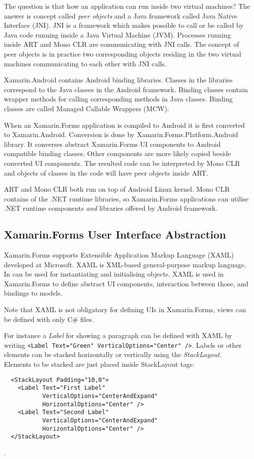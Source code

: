 \documentclass[conference]{IEEEtran}
\newcommand{\code}[1]{{\small\texttt{#1}}}
\begin{document}
The question is that how an application can run inside two virtual machines? The answer is concept called \emph{peer objects} and a Java framework called Java Native Interface (JNI). JNI is a framework which makes possible to call or be called by Java code running inside a Java Virtual Machine (JVM). Processes running inside ART and Mono CLR are communicating with JNI calls. The concept of peer objects is in practice two corresponding objects residing in the two virtual machines communicating to each other with JNI calls.

Xamarin.Android contains Android binding libraries. Classes in the libraries correspond to the Java classes in the Android framework. Binding classes contain wrapper methods for calling corresponding methods in Java classes. Binding classes are called Managed Callable Wrappers (MCW).

When an Xamarin.Forms application is compiled to Android it is first converted to Xamarin.Android. Conversion is done by Xamarin.Forms.Platform.Android library. It converses abstract Xamarin.Forms UI components to Android compatible binding classes. Other components are more likely copied beside converted UI components. The resulted code can be interpreted by Mono CLR and objects of classes in the code will have peer objects inside ART.

ART and Mono CLR both run on top of Android Linux kernel. Mono CLR contains of the .NET runtime libraries, so Xamarin.Forms applications can utilise .NET runtime components \emph{and} libraries offered by Android framework.

\subsection{Xamarin.Forms User Interface Abstraction}

Xamarin.Forms supports Extensible Application Markup Language (XAML) developed at Microsoft. XAML is XML-based general-purpose markup language. In can be used for instantiating and initialising objects. XAML is used in Xamarin.Forms to define abstract UI components, interaction between those, and bindings to models.

Note that XAML is not obligatory for defining UIs in Xamarin.Forms, views can be defined with only C\# files.

For instance a \emph{Label} for showing a paragraph can be defined with XAML by writing \code{<Label Text="Green" VerticalOptions="Center" />}. Labels or other elements can be stacked horizontally or vertically using the \emph{StackLayout}. Elements to be stacked are just placed inside StackLayout tags:
\begin{lstlisting}
  <StackLayout Padding="10,0">
    <Label Text="First Label"
           VerticalOptions="CenterAndExpand"
           HorizontalOptions="Center" />
    <Label Text="Second Label"
           VerticalOptions="CenterAndExpand"
           HorizontalOptions="Center" />
  </StackLayout>
\end{lstlisting}.
\end{document}
